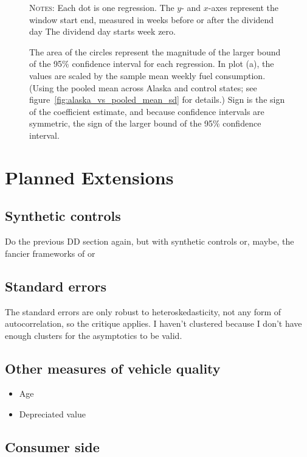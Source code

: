 \documentclass[11pt,letterpaper,oneside]{article}
\begin{document}
\begin{doublespacing}
\begin{figure}[hbt]
    {\footnotesize
    \textsc{Notes:}
    Each dot is one regression.
    The $y$- and $x$-axes represent the window start end, measured in weeks before or after the dividend day
    The dividend day starts week zero.

     The area of the circles represent the magnitude of the larger bound of the 95\% confidence interval for each regression.
    In plot (a), the values are scaled by the sample mean weekly fuel consumption.
    (Using the pooled mean across Alaska and control states; see figure~\ref{fig:alaska_vs_pooled_mean_sd} for details.)
    Sign is the sign of the coefficient estimate, and because confidence intervals are symmetric, the sign of the larger bound of the 95\% confidence interval.
    }
\end{figure}



\section{Planned Extensions}

\subsection{Synthetic controls}
\label{sec:synthetic-controls}
Do the previous DD section again, but with synthetic controls or, maybe, the fancier frameworks of
\textcite{DoudchenkoImbens2016DD} or \textcite{Xu2016}

\subsection{Standard errors}
The standard errors are only robust to heteroskedasticity, not any form of autocorrelation, so the \textcite{bertrand_duflo2004DD} critique applies.
I haven't clustered because I don't have enough clusters for the asymptotics to be valid.

\subsection{Other measures of vehicle quality}
\begin{itemize}
    \item Age
    \item Depreciated value
\end{itemize}

\subsection{Consumer side}

\end{doublespacing}
\end{document}
